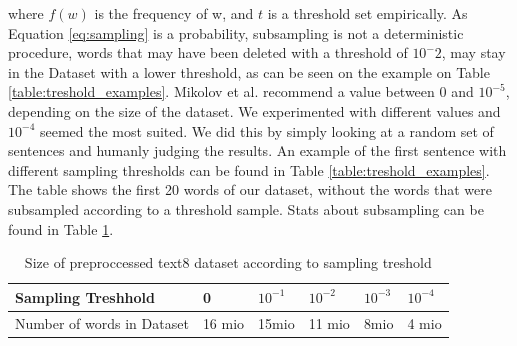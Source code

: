 where $f(w)$ is the frequency of w, and $t$ is a threshold set empirically. As Equation \ref{eq:sampling} is a probability, subsampling is not a deterministic procedure, words that may have been deleted with a threshold of $10^-2$, may stay in the Dataset with a lower threshold, as can be seen on the example on Table \ref{table:treshold_examples}. Mikolov et al. recommend a value between $0$ and $10^{-5}$, depending on the size of the dataset. We experimented with different values and $10^{-4}$ seemed the most suited. We did this by simply looking at a random set of sentences and humanly judging the results. An example of the first sentence with different sampling thresholds can be found in Table \ref{table:treshold_examples}. The table shows the first 20 words of our dataset, without the words that were subsampled according to a threshold sample. Stats about subsampling can be found in Table \ref{table:treshold}. 
\begin{table}[h]
\centering
\begin{tabular}{|l|l|l|l|l|l|}
\hline
Sampling Treshhold &  0      &      $ 10^{-1}$&$   10^{-2}$& $10^{-3}     $ &$10^{-4}   $    \\ \hline
Number of words in Dataset    & 16 mio & 15mio & 11 mio & 8mio & 4 mio \\ \hline
\end{tabular}
\caption{Size of preproccessed text8 dataset according to sampling treshold}
\label{table:treshold}
\end{table}

